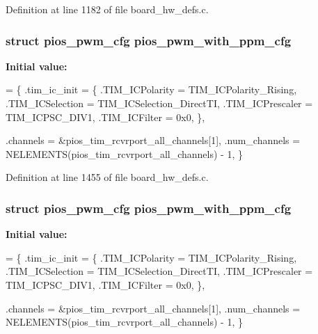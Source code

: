 Definition at line 1182 of file board\-\_\-hw\-\_\-defs.\-c.

\hypertarget{group___tau_labs_core_ga6a7a8338c617f18384f3b3c5678f5505}{
\subsubsection[{pios\-\_\-pwm\-\_\-with\-\_\-ppm\-\_\-cfg}]{\setlength{\rightskip}{0pt plus 5cm}struct {\bf pios\-\_\-pwm\-\_\-cfg} pios\-\_\-pwm\-\_\-with\-\_\-ppm\-\_\-cfg}}\label{group___tau_labs_core_ga6a7a8338c617f18384f3b3c5678f5505}
{\bfseries Initial value\-:}
\begin{DoxyCode}
= \{
        .tim\_ic\_init = \{
                .TIM\_ICPolarity = TIM\_ICPolarity\_Rising,
                .TIM\_ICSelection = TIM\_ICSelection\_DirectTI,
                .TIM\_ICPrescaler = TIM\_ICPSC\_DIV1,
                .TIM\_ICFilter = 0x0,
        \},
        
        .channels = &pios\_tim\_rcvrport\_all\_channels[1],
        .num\_channels = NELEMENTS(pios\_tim\_rcvrport\_all\_channels) - 1,
\}
\end{DoxyCode}


Definition at line 1455 of file board\-\_\-hw\-\_\-defs.\-c.

\hypertarget{group___tau_labs_core_ga6a7a8338c617f18384f3b3c5678f5505}{
\subsubsection[{pios\-\_\-pwm\-\_\-with\-\_\-ppm\-\_\-cfg}]{\setlength{\rightskip}{0pt plus 5cm}struct {\bf pios\-\_\-pwm\-\_\-cfg} pios\-\_\-pwm\-\_\-with\-\_\-ppm\-\_\-cfg}}\label{group___tau_labs_core_ga6a7a8338c617f18384f3b3c5678f5505}
{\bfseries Initial value\-:}
\begin{DoxyCode}
= \{
        .tim\_ic\_init = \{
                .TIM\_ICPolarity = TIM\_ICPolarity\_Rising,
                .TIM\_ICSelection = TIM\_ICSelection\_DirectTI,
                .TIM\_ICPrescaler = TIM\_ICPSC\_DIV1,
                .TIM\_ICFilter = 0x0,
        \},
        
        .channels = &pios\_tim\_rcvrport\_all\_channels[1],
        .num\_channels = NELEMENTS(pios\_tim\_rcvrport\_all\_channels) - 1,
\}
\end{DoxyCode}


